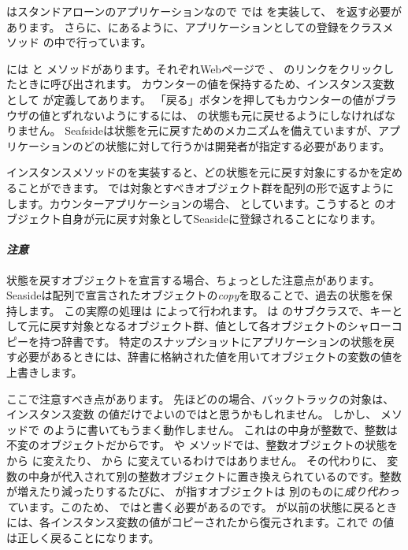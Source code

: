 \documentclass[a4paper,10pt,twoside]{book}
\begin{document}
 はスタンドアローンのアプリケーションなので  では   を実装して、 を返す必要があります。
さらに、にあるように、アプリケーションとしての登録をクラスメソッド の中で行っています。

 には  と メソッドがあります。それぞれWebページで \link{++} 、 \link{--\,--} のリンクをクリックしたときに呼び出されます。
カウンターの値を保持するため、インスタンス変数として が定義してあります。
「戻る」ボタンを押してもカウンターの値がブラウザの値とずれないようにするには、 の状態も元に戻せるようにしなければなりません。
Seafsideは状態を元に戻すためのメカニズムを備えていますが、アプリケーションのどの状態に対して行うかは開発者が指定する必要があります。

インスタンスメソッドのを実装すると、どの状態を元に戻す対象にするかを定めることができます。
 では対象とすべきオブジェクト群を配列の形で返すようにします。カウンターアプリケーションの場合、 としています。こうすると  のオブジェクト自身が元に戻す対象としてSeasideに登録されることになります。

\paragraph{\emph{注意}}
状態を戻すオブジェクトを宣言する場合、ちょっとした注意点があります。
Seasideは配列で宣言されたオブジェクトの\emph{copy}を取ることで、過去の状態を保持します。
この実際の処理は  によって行われます。 は  のサブクラスで、キーとして元に戻す対象となるオブジェクト群、値として各オブジェクトのシャローコピーを持つ辞書です。
特定のスナップショットにアプリケーションの状態を戻す必要があるときには、辞書に格納された値を用いてオブジェクトの変数の値を上書きします。

ここで注意すべき点があります。
先ほどのの場合、バックトラックの対象は、インスタンス変数 の値だけでよいのではと思うかもしれません。
しかし、 メソッドで のように書いてもうまく動作しません。
これはの中身が整数で、整数は不変のオブジェクトだからです。
  や  メソッドでは、整数オブジェクトの状態を から  に変えたり、 から に変えているわけではありません。
その代わりに、  変数の中身が代入されて別の整数オブジェクトに置き換えられているのです。整数が増えたり減ったりするたびに、  が指すオブジェクトは 別のものに\emph{成り代わって}います。このため、 ではと書く必要があるのです。 \mbox{} が以前の状態に戻るときには、各インスタンス変数の値がコピーされた\mbox{}から復元されます。これで  の値は正しく戻ることになります。
\end{document}
